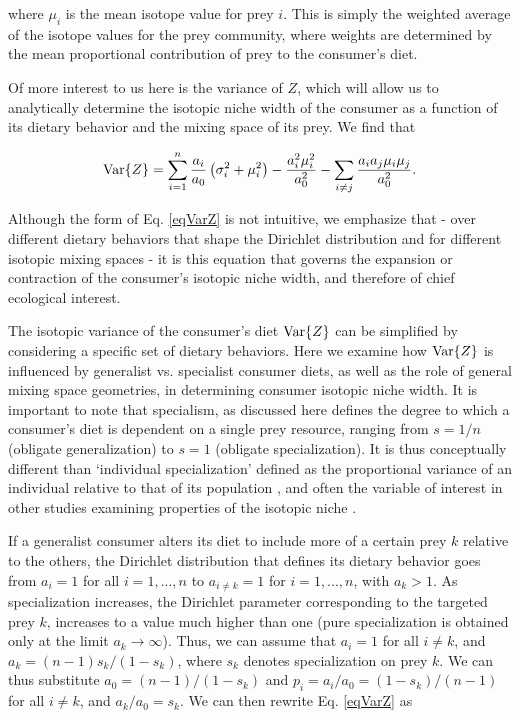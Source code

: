\documentclass{frontiersSCNS}
\begin{document}
\noindent where $\mu_i$ is the mean isotope value for prey $i$.
This is simply the weighted average of the isotope values for the prey community, where weights are determined by the mean proportional contribution of prey to the consumer's diet.

Of more interest to us here is the variance of $Z$, which will allow us to analytically determine the isotopic niche width of the consumer as a function of its dietary behavior and the mixing space of its prey.
We find that

\begin{equation}
\label{eqVarZ}
  {\rm Var}\{Z\} = \sum_{i=1}^n \frac{a_i}{a_0}\left(\sigma_i^2 + \mu_i^2\right) - \frac{a_i^2\mu_i^2}{a_0^2}-\sum_{i \neq j}\frac{a_i a_j \mu_i \mu_j}{a_0^2}.
\end{equation}

\noindent Although the form of Eq. \ref{eqVarZ} is not intuitive, we emphasize that - over different dietary behaviors that shape the Dirichlet distribution and for different isotopic mixing spaces - it is this equation that governs the expansion or contraction of the consumer's isotopic niche width, and therefore of chief ecological interest.

The isotopic variance of the consumer's diet ${\rm Var}\{Z\}$ can be simplified by considering a specific set of dietary behaviors.
Here we examine how ${\rm Var}\{Z\}$ is influenced by generalist vs. specialist consumer diets, as well as the role of general mixing space geometries, in determining consumer isotopic niche width.
It is important to note that specialism, as discussed here defines the degree to which a consumer's diet is dependent on a single prey resource, ranging from $s=1/n$ (obligate generalization) to $s=1$ (obligate specialization).
It is thus conceptually different than `individual specialization' defined as the proportional variance of an individual relative to that of its population \citep[Within-Individual Component / Total Niche Width, or WIC/TNW;][]{J:1979wc}, and often the variable of interest in other studies examining properties of the isotopic niche \citep{Araujo:2007iua,Araujo:2009p2286,Araujo:2011gm,Layman:2011cm}.

If a generalist consumer alters its diet to include more of a certain prey $k$ relative to the others, the Dirichlet distribution that defines its dietary behavior goes from $a_i=1$ for all $i=1,...,n$ to $a_{i \neq k}=1$ for $i=1,...,n$, with $a_k>1$.
As specialization increases, the Dirichlet parameter corresponding to the targeted prey $k$, increases to a value much higher than one (pure specialization is obtained only at the limit $a_k \to \infty$).
Thus, we can assume that $a_i=1$ for all $i \neq k$, and $a_k = (n-1)s_k/(1-s_k)$, where $s_k$ denotes specialization on prey $k$. %
We can thus substitute $a_0 = (n-1)/(1-s_k)$ and $p_i = a_i/a_0 = (1-s_k)/(n-1)$ for all $i \neq k$, and $a_k/a_0 = s_k$.
We can then rewrite Eq. \ref{eqVarZ} as
\end{document}
